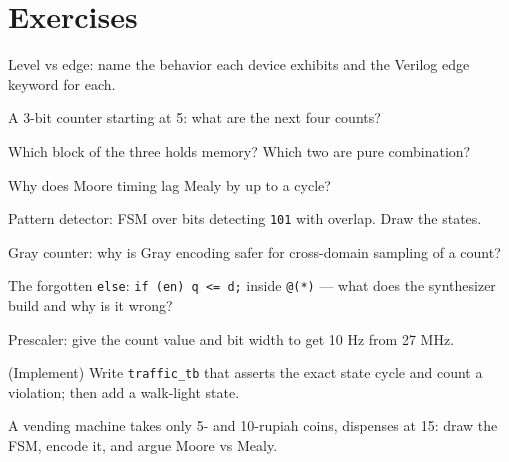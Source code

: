 \section{Exercises}
\label{sec:exercises10}

\begin{exercise}[easy]
Level vs edge: name the behavior each device exhibits and the Verilog
edge keyword for each.
\end{exercise}
\begin{exercise}[easy]
A 3-bit counter starting at 5: what are the next four counts?
\end{exercise}
\begin{exercise}[easy]
Which block of the three holds memory? Which two are pure combination?
\end{exercise}
\begin{exercise}[easy]
Why does Moore timing lag Mealy by up to a cycle?
\end{exercise}
\begin{exercise}[medium]
Pattern detector: FSM over bits detecting \texttt{101} with overlap.
Draw the states.
\end{exercise}
\begin{exercise}[medium]
Gray counter: why is Gray encoding safer for cross-domain sampling of
a count?
\end{exercise}
\begin{exercise}[medium]
The forgotten \texttt{else}: \texttt{if (en) q <= d;} inside
\texttt{@(*)} — what does the synthesizer build and why is it wrong?
\end{exercise}
\begin{exercise}[medium]
Prescaler: give the count value and bit width to get 10 Hz from 27 MHz.
\end{exercise}
\begin{exercise}[hard]
(Implement) Write \texttt{traffic\_tb} that asserts the exact state
cycle and count a violation; then add a walk-light state.
\end{exercise}
\begin{exercise}[hard]
A vending machine takes only 5- and 10-rupiah coins, dispenses at 15:
draw the FSM, encode it, and argue Moore vs Mealy.
\end{exercise}

